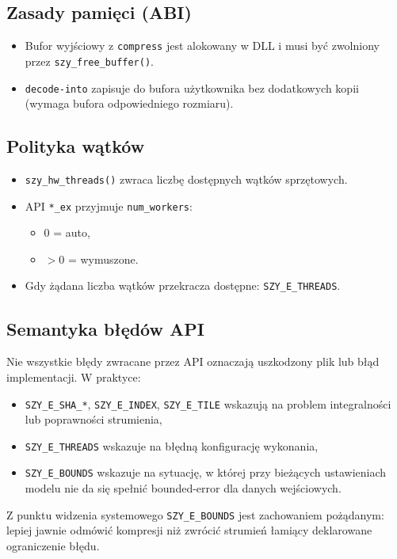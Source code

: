 \documentclass[11pt,a4paper]{article}
\begin{document}
\subsection{Zasady pamięci (ABI)}
\begin{itemize}
  \item Bufor wyjściowy z \texttt{compress} jest alokowany w DLL i musi być zwolniony przez \texttt{szy\_free\_buffer()}.
  \item \texttt{decode-into} zapisuje do bufora użytkownika bez dodatkowych kopii (wymaga bufora odpowiedniego rozmiaru).
\end{itemize}

\subsection{Polityka wątków}
\begin{itemize}
  \item \texttt{szy\_hw\_threads()} zwraca liczbę dostępnych wątków sprzętowych.
  \item API \texttt{*\_ex} przyjmuje \texttt{num\_workers}:
    \begin{itemize}
      \item 0 = auto,
      \item $>0$ = wymuszone.
    \end{itemize}
  \item Gdy żądana liczba wątków przekracza dostępne: \texttt{SZY\_E\_THREADS}.
\end{itemize}

\subsection{Semantyka błędów API}
Nie wszystkie błędy zwracane przez API oznaczają uszkodzony plik lub błąd implementacji. W praktyce:
\begin{itemize}
  \item \texttt{SZY\_E\_SHA\_*}, \texttt{SZY\_E\_INDEX}, \texttt{SZY\_E\_TILE} wskazują na problem integralności lub poprawności strumienia,
  \item \texttt{SZY\_E\_THREADS} wskazuje na błędną konfigurację wykonania,
  \item \texttt{SZY\_E\_BOUNDS} wskazuje na sytuację, w której przy bieżących ustawieniach modelu nie da się spełnić bounded-error dla danych wejściowych.
\end{itemize}

Z punktu widzenia systemowego \texttt{SZY\_E\_BOUNDS} jest zachowaniem pożądanym: lepiej jawnie odmówić kompresji niż zwrócić strumień łamiący deklarowane ograniczenie błędu.
\end{document}
